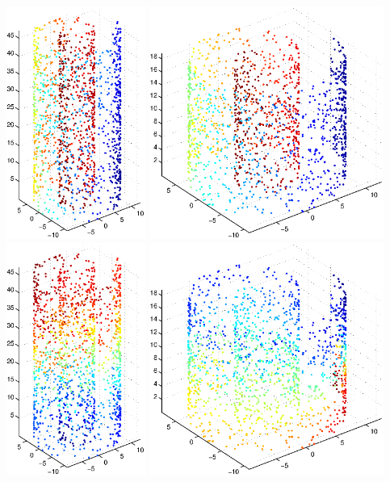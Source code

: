 \documentclass[12pt]{article}
\begin{document}
\includegraphics[height=3in]{swissroll1_color1}
\includegraphics[height=3in]{swissroll2_color1}\\
\includegraphics[height=3in]{swissroll1_color2}
\includegraphics[height=3in]{swissroll2_color2}
\end{document}
